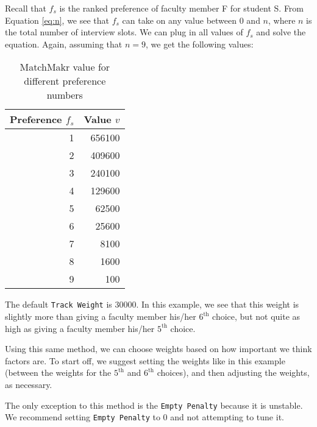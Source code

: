 Recall that $f_s$ is the ranked preference of faculty member F for student S.  From Equation \ref{eq:n}, we see that $f_s$ can take on any value between 0 and $n$, where $n$ is the total number of interview slots.  We can plug in all values of $f_s$ and solve the equation.  Again, assuming that $n=9$, we get the following values:

\begin{table}[h!]
	\centering
	\begin{tabular}{| r | r|}
		\hline
		\textbf{Preference $f_s$} & \textbf{Value $v$} \\ \hline \hline
		
		1 & 656100 \\ 
		2 & 409600 \\ 
		3 & 240100 \\ 
		4 & 129600 \\ 
		5 & 62500 \\ 
		6 & 25600 \\ 
		7 & 8100 \\ 
		8 & 1600 \\ 
		9 & 100 \\ \hline
		
	\end{tabular}
	\caption{\label{tab:values} MatchMakr value for different preference numbers}
\end{table}

The default \texttt{Track Weight} is 30000.  In this example, we see that this weight is slightly more than giving a faculty member his/her $6^\text{th}$ choice, but not quite as high as giving a faculty member his/her $5^\text{th}$ choice.

Using this same method, we can choose weights based on how important we think factors are.  To start off, we suggest setting the weights like in this example (between the weights for the $5^\text{th}$ and $6^\text{th}$ choices), and then adjusting the weights, as necessary.

The only exception to this method is the \texttt{Empty Penalty} because it is unstable.  We recommend setting \texttt{Empty Penalty} to 0 and not attempting to tune it.
























































